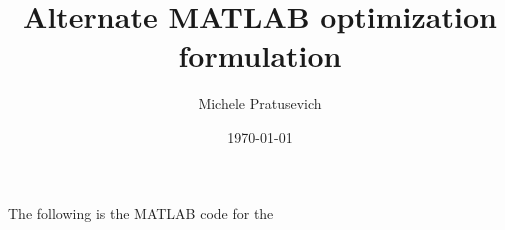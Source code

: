 \documentclass{article}
\title{Alternate MATLAB optimization formulation}
\author{Michele Pratusevich}
\date{\today}
\begin{document}
The following is the MATLAB code for the 
\end{document}
